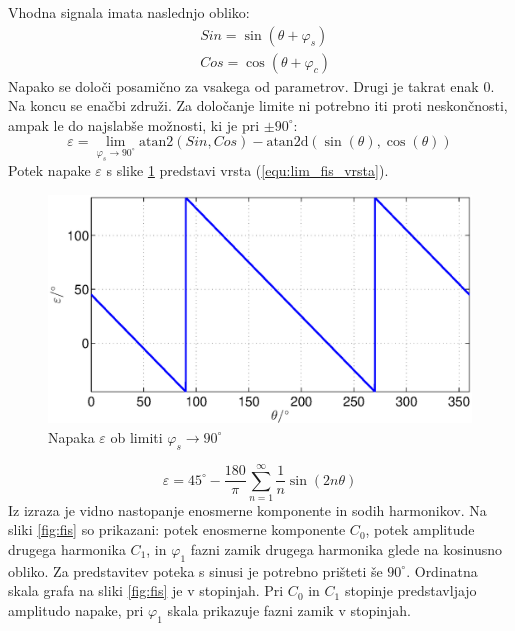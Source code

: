 \documentclass[a4paper]{article}
\begin{document}
Vhodna signala imata naslednjo obliko:
\begin{eqnarray}
\label{equ:def_sin_fis}
&Sin = \sin(\theta + \varphi_{s})\\
\label{equ:def_cos_fis}
&Cos =\cos(\theta+\varphi_{c})
\end{eqnarray}
Napako se določi posamično za vsakega od parametrov. Drugi je takrat enak 0. Na koncu se enačbi združi. Za določanje limite ni potrebno iti proti neskončnosti, ampak le do najslabše možnosti, ki je pri $\pm 90^\circ$:
\begin{equation}
\label{equ:fis_lim}
\varepsilon = \lim_{\varphi_{s} \rightarrow 90^\circ} \mathrm{atan2}(Sin ,Cos)- \mathrm{atan2d}(\sin(\theta),\cos(\theta))
\end{equation}
Potek napake $\varepsilon$ s slike \ref{fig:lim_sin_fis} predstavi vrsta (\ref{equ:lim_fis_vrsta}).
\begin{figure}[!htb]
    \begin{center}
        \includegraphics[width=\linewidth]{./Slike/lim_sinfaza.eps}
        \caption{Napaka $\varepsilon$ ob limiti $\varphi_{s} \rightarrow 90^\circ$} \label{fig:lim_sin_fis}
    \end{center}
\end{figure}
\begin{equation}
\label{equ:lim_fis_vrsta}
\varepsilon = 45^\circ - \frac{180}{\pi}\sum_{n=1}^{\infty}\frac{1}{n} \sin (2n \theta)
\end{equation} 
Iz  izraza je vidno nastopanje enosmerne komponente in sodih harmonikov. Na sliki \ref{fig:fis} so prikazani: potek enosmerne komponente $C_0$, potek amplitude drugega harmonika $C_1$, in $\varphi_1$ fazni zamik drugega harmonika glede na kosinusno obliko. Za predstavitev poteka s sinusi je potrebno prišteti še $90^\circ$. Ordinatna skala grafa na sliki \ref{fig:fis} je v stopinjah. Pri $C_0$ in $C_1$ stopinje predstavljajo amplitudo napake, pri $\varphi_{1}$ skala prikazuje fazni zamik v stopinjah.
\end{document}
